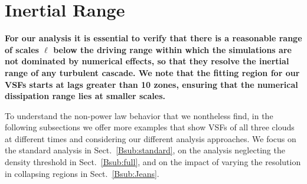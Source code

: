 
\section{Inertial Range}\label{appInertial}


{\bf For our analysis it is essential to verify that there is a
  reasonable range of scales $\ell$ below the driving range within
  which the simulations are not dominated by numerical effects,
    so that 
they resolve the inertial range of any turbulent cascade.  
    We note that the fitting region for our VSFs starts at
    lags greater than 10 zones, ensuring that the numerical
    dissipation range lies at smaller scales.

    To understand the non-power law behavior that we nontheless find,
    in the following subsections
we offer more examples that show VSFs of all three clouds at different
times and considering our different analysis approaches. 
We focus on the standard analysis in Sect.~\ref{Bsub:standard}, on the
analysis neglecting the density threshold in Sect.~\ref{Bsub:full},
and on the impact of varying the resolution in collapsing regions in Sect.~\ref{Bsub:Jeans}.
}
 	
